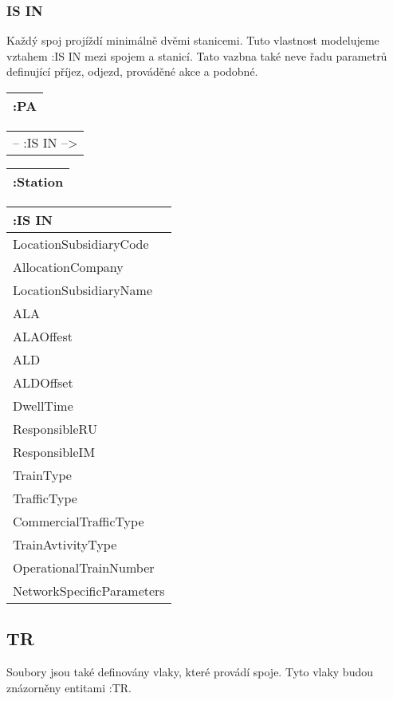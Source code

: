 \documentclass[10pt,xcolor=pdflatex,dvipsnames,table,oneside]{book}
\begin{document}
\subsubsection{IS IN}
Každý spoj projíždí minimálně dvěmi stanicemi. Tuto vlastnost modelujeme vztahem :IS IN mezi spojem a stanicí.
Tato vazbna také neve řadu parametrů definující příjez, odjezd, prováděné akce a podobné.

\vspace{1em}
\begin{tabular}{|l|}
    \hline
    :PA \\
    \hline
\end{tabular}
\begin{tabular}{c}
    -- :IS IN --> \\
\end{tabular}
\begin{tabular}{|l|}
    \hline
    :Station \\
    \hline
\end{tabular}

\vspace{1em}
\begin{tabular}{|l|}
    \hline
    :IS IN \\
    \hline
    LocationSubsidiaryCode \\
    AllocationCompany \\
    LocationSubsidiaryName \\
    ALA \\
    ALAOffest \\
    ALD \\
    ALDOffset \\
    DwellTime \\
    ResponsibleRU \\
    ResponsibleIM \\
    TrainType \\
    TrafficType \\
    CommercialTrafficType \\
    TrainAvtivityType \\
    OperationalTrainNumber \\
    NetworkSpecificParameters \\
    \hline
\end{tabular}

\subsection{TR}
Soubory jsou také definovány vlaky, které provádí spoje. Tyto vlaky budou znázorněny entitami :TR.
\end{document}
